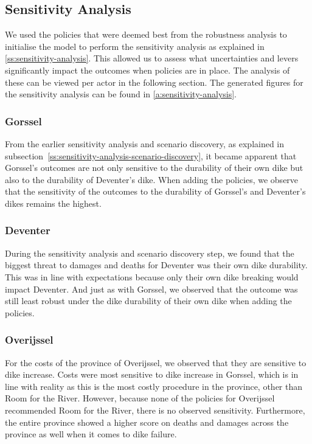 \subsection{Sensitivity Analysis}

We used the policies that were deemed best from the robustness analysis to initialise the model to perform the sensitivity analysis as explained in \autoref{ss:sensitivity-analysis}. This allowed us to assess what uncertainties and levers significantly impact the outcomes when policies are in place. The analysis of these can be viewed per actor in the following section. The generated figures for the sensitivity analysis can be found in \autoref{a:sensitivity-analysis}.


\subsubsection{Gorssel}
From the earlier sensitivity analysis and scenario discovery, as explained in subsection~\ref{ss:sensitivity-analysis-scenario-discovery}, it became apparent that Gorssel's outcomes are not only sensitive to the durability of their own dike but also to the durability of Deventer's dike. When adding the policies, we observe that the sensitivity of the outcomes to the durability of Gorssel's and Deventer's dikes remains the highest. 

\subsubsection{Deventer}

During the sensitivity analysis and scenario discovery step, we found that the biggest threat to damages and deaths for Deventer was their own dike durability. This was in line with expectations because only their own dike breaking would impact Deventer. And just as with Gorssel, we observed that the outcome was still least robust under the dike durability of their own dike when adding the policies. 

\subsubsection{Overijssel}
For the costs of the province of Overijssel, we observed that they are sensitive to dike increase. Costs were most sensitive to dike increase in Gorssel, which is in line with reality as this is the most costly procedure in the province, other than Room for the River. However, because none of the policies for Overijssel recommended Room for the River, there is no observed sensitivity. Furthermore, the entire province showed a higher score on deaths and damages across the province as well when it comes to dike failure. 

